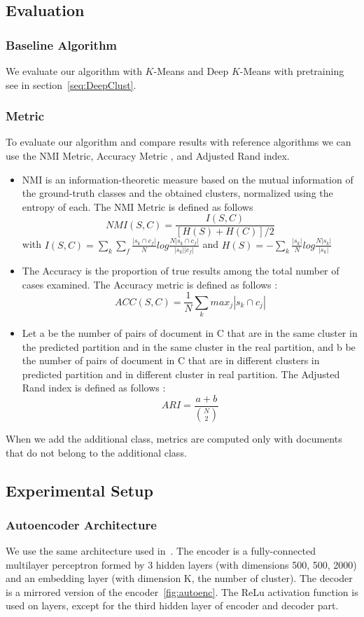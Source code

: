 \subsection{Evaluation}
\subsubsection{Baseline Algorithm}
We evaluate our algorithm with $K$-Means and Deep $K$-Means with pretraining 
see in section~\ref{seq:DeepClust}.
\subsubsection{Metric}
To evaluate our algorithm and compare results with reference algorithms we can
use the NMI Metric, Accuracy Metric \cite{NMI_ACC}, and Adjusted
Rand index\cite{ARI}. 
\begin{itemize}
\item NMI is an information-theoretic measure based on the mutual information of the ground-truth classes
and the obtained clusters, normalized using the entropy of each. The NMI Metric is defined as follows
$$NMI(S,C) = \frac{I(S,C)}{[H(S)+H(C)]/2}$$ 
with
$I(S,C) =\sum\limits_k \sum\limits_f\frac{|s_k \cap c_f|}{N}log\frac{N|s_k \cap c_f|}{|s_k| |c_f|}$
and
$H(S) = -\sum\limits_k\frac{|s_k|}{N}log\frac{N|s_k|}{|s_k|}$
\item The Accuracy is the proportion of true results among the total
  number of cases examined. The Accuracy metric is defined as follows :
$$
ACC(S,C) = \frac{1}{N}\sum\limits_k {max}_j|s_k \cap c_j|
$$
\item Let a be the number of pairs of document in C
  that are in the same cluster in the predicted partition and in the
  same cluster in the real partition, and b be the number of pairs of
  document in C that are in different clusters in predicted partition
  and in different cluster in real partition.
  The Adjusted Rand index is defined as follows :
  $$ARI = \frac{a+b}{\binom{N}{2}}$$
\end{itemize}
When we add the additional class, metrics are computed only with
documents that do not belong to the additional class.
\subsection{Experimental Setup}
\subsubsection{Autoencoder Architecture}
We use the same architecture used in~\cite{Deap-K-Means}. The encoder is a fully-connected 
multilayer perceptron formed by 3 hidden layers (with dimensions 500, 500, 2000) 
and an embedding layer (with dimension K, the number of cluster). 
The decoder is a mirrored version of the encoder~\ref{fig:autoenc}.
The ReLu activation function is used on layers, except for the third
hidden layer of encoder and decoder part.
